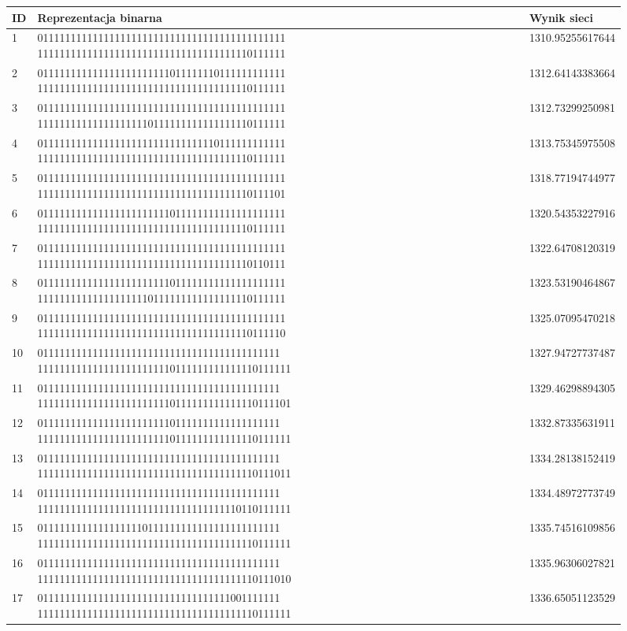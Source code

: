 \documentclass[twoside,12pt]{report}
\begin{document}
\begin{figure}[htbp]
\centering
{}
\label{tab:tabela_wynikow} 
\begin{tabularx}{\linewidth}{ | l | X | l | }
	\hline
	ID & Reprezentacja binarna & Wynik sieci \\
	\hline
	1 & 011111111111111111111111111111111111111111111 111111111111111111111111111111111111110111111 & 1310.95255617644 \\ \hline
	2 & 011111111111111111111111011111110111111111111 111111111111111111111111111111111111110111111 & 1312.64143383664 \\ \hline
	3 & 011111111111111111111111111111111111111111111 111111111111111111110111111111111111110111111 & 1312.73299250981 \\ \hline
	4 & 011111111111111111111111111111110111111111111 111111111111111111111111111111111111110111111 & 1313.75345975508 \\ \hline
	5 & 011111111111111111111111111111111111111111111 111111111111111111111111111111111111110111101 & 1318.77194744977 \\ \hline
	6 & 011111111111111111111111011111111111111111111 111111111111111111111111111111111111110111111 & 1320.54353227916 \\ \hline
	7 & 011111111111111111111111111111111111111111111 111111111111111111111111111111111111110110111 & 1322.64708120319 \\ \hline
	8 & 011111111111111111111111011111111111111111111 111111111111111111110111111111111111110111111 & 1323.53190464867 \\ \hline
	9 & 011111111111111111111111111111111111111111111 111111111111111111111111111111111111110111110 & 1325.07095470218 \\ \hline
	10 & 01111111111111111111111111111111111111111111 1111111111111111111111110111111111111110111111 & 1327.94727737487 \\ \hline
	11 & 01111111111111111111111111111111111111111111 1111111111111111111111110111111111111110111101 & 1329.46298894305 \\ \hline
	12 & 01111111111111111111111101111111111111111111 1111111111111111111111110111111111111110111111 & 1332.87335631911 \\ \hline
	13 & 01111111111111111111111111111111111111111111 1111111111111111111111111111111111111110111011 & 1334.28138152419 \\ \hline
	14 & 01111111111111111111111111111111111111111111 1111111111111111111111111111111111110110111111 & 1334.48972773749 \\ \hline
	15 & 01111111111111111110111111111111111111111111 1111111111111111111111111111111111111110111111 & 1335.74516109856 \\ \hline
	16 & 01111111111111111111111111111111111111111111 1111111111111111111111111111111111111110111010 & 1335.96306027821 \\ \hline
	17 & 01111111111111111111111111111111111001111111 1111111111111111111111111111111111111110111111 & 1336.65051123529 \\ \hline
\end{tabularx}
\end{figure}%
\clearpage
\end{document}
